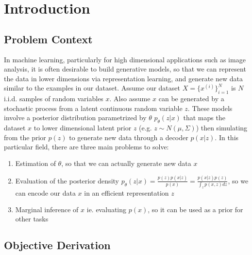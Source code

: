 \documentclass[a4paper,12pt]{article}
\numberwithin{equation}{section}
\begin{document}
\tableofcontents
\section{Introduction}
\subsection{Problem Context}
In machine learning, particularly for high dimensional applications such as image analysis, it is often desirable to build generative models, so that we can represent the data in lower dimensions via representation learning, and generate new data similar to the examples in our dataset. Assume our dataset $X=\{x^{(i)}\}^N_{i=1}$ is $N$ i.i.d. samples of random variables $x$. Also assume $x$ can be generated by a stochastic process from a latent continuous random variable $z$. These models involve a posterior distribution parametrized by $\theta$ $p_\theta(z|x)$ that maps the dataset $x$ to lower dimensional latent prior $z$ (e.g. $z\sim N(\mu,\Sigma)$) then simulating from the prior $p(z)$ to generate new data through a decoder $p(x|z)$. In this particular field, there are three main problems to solve:
\begin{enumerate}
\item Estimation of $\theta$, so that we can actually generate new data $x$
\item Evaluation of the posterior density $p_\theta(z|x) = \frac{p(z)p(x|z)}{p(x)} = \frac{p(x|z)p(z)}{\int_z p(x,z)dz}$, so we can encode our data $x$ in an efficient representation $z$
\item Marginal inference of $x$ ie. evaluating $p(x)$, so it can be used as a prior for other tasks
\end{enumerate}
\newpage
\subsection{Objective Derivation}
\end{document}

